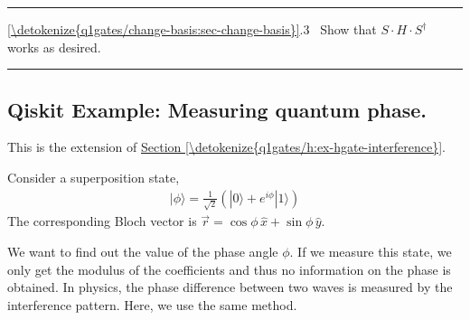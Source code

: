 \documentclass[letterpaper,10pt,english]{jupyterBook}
\begin{document}
\bigskip\hrule\bigskip


\sphinxAtStartPar
{} \hyperref[\detokenize{q1gates/change-basis:sec-change-basis}]{\ref{\detokenize{q1gates/change-basis:sec-change-basis}}}.3   Show that \(S \cdot H \cdot S^\dagger\) works as desired.


\bigskip\hrule\bigskip



\subsection{Qiskit Example:  Measuring quantum phase.}
\label{\detokenize{q1gates/change-basis:qiskit-example-measuring-quantum-phase}}\label{\detokenize{q1gates/change-basis:ex-quantum-phase}}
\sphinxAtStartPar
This is the extension of \hyperref[\detokenize{q1gates/h:ex-hgate-interference}]{Section \ref{\detokenize{q1gates/h:ex-hgate-interference}}}.

\sphinxAtStartPar
Consider a superposition state,
\begin{equation*}
\begin{split}
|\phi\rangle = \frac{1}{\sqrt{2}}\left(|0\rangle + e^{i \phi} |1\rangle\right)
\end{split}
\end{equation*}
\sphinxAtStartPar
The corresponding Bloch vector is \(\vec{r} = \cos\phi\, \hat{x} + \sin\phi\,\hat{y}\).

\sphinxAtStartPar
We want to find out the value of the phase angle \(\phi\).  If we measure this state, we only get the modulus of the coefficients and thus no information on the phase is obtained.  In physics, the phase difference between two waves is measured by the interference pattern.  Here, we use the same method.
\end{document}
